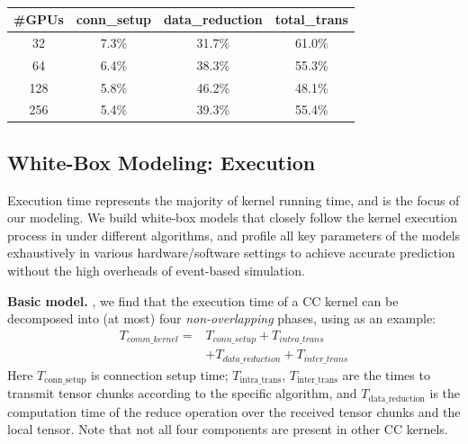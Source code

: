 \begin{table}[t]
\centering
\small
\renewcommand{\arraystretch}{0.8}
\begin{tabular}{cccc}
\toprule
\#GPUs & conn\_setup & data\_reduction & total\_trans \\
\midrule
32  & 7.3\% & 31.7\% & 61.0\% \\
64  & 6.4\% & 38.3\% & 55.3\% \\
128 & 5.8\% & 46.2\% & 48.1\% \\
256 & 5.4\% & 39.3\% & 55.4\% \\
\bottomrule
\end{tabular}
\caption{}
\label{table:runtime_percentage}
\vspace{-2em}
\end{table}



\subsection{White-Box Modeling: Execution}
\label{subsec:whitebox_modeling}


\noindent Execution time represents the majority of kernel running time, and is the focus of our modeling. We build white-box models that closely follow the kernel execution process in \nccl under different algorithms, and profile all key parameters of the models exhaustively in various hardware/software settings to achieve accurate prediction without the high overheads of event-based simulation.

\noindent\textbf{Basic model.}
, we find that the execution time of a CC kernel can be decomposed into (at most) four \textit{non-overlapping} phases, using \ar as an example:
\begin{equation} 
    \begin{split} 
        T_{comm\_kernel} = & T_{conn\_setup} +T_{intra\_trans} 
        \\ & +T_{data\_reduction} +T_{inter\_trans}
    \end{split} 
    \label{eqn:cc_basic} 
\end{equation}
Here $T_{\text{conn\_setup}}$ is connection setup time; $T_{\text{intra\_trans}}$, $T_{\text{inter\_trans}}$ are the times to transmit tensor chunks according to the specific algorithm, and $T_{\text{data\_reduction}}$ is the computation time of the reduce operation over the received tensor chunks and the local tensor. 
Note that not all four components are present in other CC kernels. 

